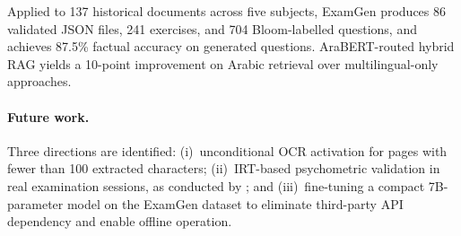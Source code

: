 \documentclass[12pt, a4paper]{article}
\begin{document}
Applied to 137 historical documents across five subjects, ExamGen produces 86 validated
JSON files, 241 exercises, and 704 Bloom-labelled questions, and achieves 87.5\%
factual accuracy on generated questions. AraBERT-routed hybrid RAG yields a
10-point improvement on Arabic retrieval over multilingual-only approaches.

\paragraph{Future work.}
Three directions are identified: (i)~unconditional OCR activation for pages
with fewer than 100 extracted characters; (ii)~IRT-based psychometric validation
in real examination sessions, as conducted by \citet{isley2025quality};
and (iii)~fine-tuning a compact 7B-parameter model on the ExamGen dataset to
eliminate third-party API dependency and enable offline operation.
\end{document}
